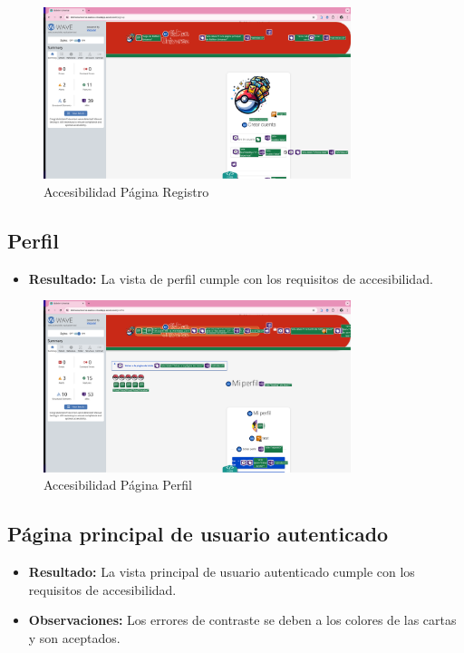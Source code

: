 \begin{figure}[H]
    \centering
    \includegraphics[width=0.8\textwidth]{figures/accesibilidad/A-acc-registro.png}
    \caption{Accesibilidad Página Registro}
    \label{fig:Acc-Registro}
\end{figure}


\subsection*{Perfil}
\begin{itemize}
    \item \textbf{Resultado:} La vista de perfil cumple con los requisitos de accesibilidad.
\end{itemize}

\begin{figure}[H]
    \centering
    \includegraphics[width=0.8\textwidth]{figures/accesibilidad/A-acc-perfil.png}
    \caption{Accesibilidad Página Perfil}
    \label{fig:Acc-Perfil}
\end{figure}


\subsection*{Página principal de usuario autenticado}
\begin{itemize}
    \item \textbf{Resultado:} La vista principal de usuario autenticado cumple con los requisitos de accesibilidad.
    \item \textbf{Observaciones:} Los errores de contraste se deben a los colores de las cartas y son aceptados.
\end{itemize}


